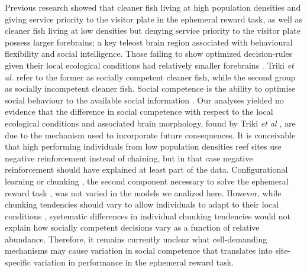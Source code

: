 \documentclass[]{rsos}%
\begin{document}
Previous research showed that cleaner fish living at high population
densities and giving service priority to the visitor plate in the
ephemeral reward task, as well as cleaner fish living at low
densities but denying service priority to the visitor plate possess
larger forebrains; a key teleost brain region associated with
behavioural flexibility and social intelligence. Those failing to
show optimized decision-rules given their local ecological
conditions had relatively smaller forebrains \citep{triki_Brain_2020}.
Triki \emph{et al.} refer to the former as socially competent cleaner fish,
while the second group as socially incompetent cleaner fish.
Social competence is the ability to optimise social behaviour
to the available social information \citep{taborsky_Social_2012, bshary_Cooperation_2015, varela_Correlated_2020}. Our analyses yielded no
evidence that the difference in social competence with respect to the local
ecological conditions and associated brain morphology,
found by Triki \emph{et al} \citep{triki_Brain_2020}, are due to the mechanism
used to incorporate future consequences. It is conceivable that
high performing individuals from low population densities reef sites
use negative reinforcement instead of chaining, but in that
case negative reinforcement should have explained at least
part of the data. Configurational learning or
chunking \citep{sutherland_Configural_1989, miller_Magical_1956},
the second component necessary to solve the ephemeral
reward task \citep{quinones_Reinforcement_2019}, was
not varied in the models we analized here. However, while chunking tendencies
should vary to allow individuals to adapt to their local conditions
\citep{prat_Modelling_2022, kolodny_Evolution_2014}, systematic differences
in individual chunking tendencies would not explain how socially
competent decisions vary as a function of relative abundance.
Therefore, it remains currently unclear what cell-demanding
mechanisms may cause variation in social competence that
translates into site-specific variation in performance in the
ephemeral reward task.
\end{document}
